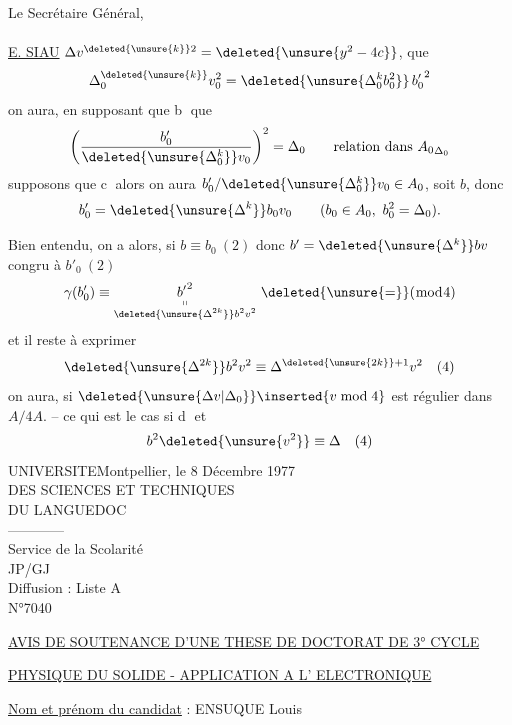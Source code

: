Le Secrétaire Général,\\
\\
\uline{E. SIAU}
  $\Delta v^{\deleted{\unsure{k}}2}=\deleted{\unsure{y^2-4c}}$,    que
\[
\Delta_0^{\deleted{\unsure{k}}}v_0^2=\deleted{\unsure{\Delta_0^k b_0^2}}\,{b'_0}^{2}
\]
on aura, en supposant que \textcircled{\scriptsize b}  que
\[
\left(\frac{b'_0}{\deleted{\unsure{\Delta_0^k}}v_0}\right)^2=\Delta_0\qquad
\text{relation dans }{A_0}_{\Delta_0}
\]
supposons que \textcircled{\scriptsize c} alors on aura $b'_0/\deleted{\unsure{\Delta_0^k}}v_0\in A_0$, soit $b$, donc
\[
b'_0=\deleted{\unsure{\Delta^k}}b_0v_0\qquad(b_0\in A_0,\ b_0^2=\Delta_0).
\]

Bien entendu, on a alors, si $b\equiv b_0\ (2)$ donc $b'=\deleted{\unsure{\Delta^k}}bv$ congru à $b'_0\ (2)$
\[
\gamma(b'_0)\equiv\underset{\substack{\shortparallel\\\deleted{\unsure{\Delta^{2k}}} b^2v^2}}{ {b'}^2}\ \deleted{\unsure{=}}(\bmod 4)
\]
et il reste à exprimer
\[
\deleted{\unsure{\Delta^{2k}}}b^2v^2\equiv\Delta^{\deleted{\unsure{2k}}+1}v^2\quad(4)
\]
on aura, si $\deleted{\unsure{\Delta v|\Delta_0}}\inserted{v\bmod4}$ est régulier dans $A/4A$. -- ce qui est le cas si \textcircled{\scriptsize d} et  
\[
b^2\deleted{\unsure{v^2}}\equiv\Delta\quad(4)
\]
UNIVERSITE\hfill Montpellier, le 8 Décembre 1977\\
DES SCIENCES ET TECHNIQUES\\
DU LANGUEDOC\\
------------\\
Service de la Scolarité\\
JP/GJ\\
Diffusion : Liste A\\
N°7040

\uline{AVIS DE SOUTENANCE D'UNE THESE DE DOCTORAT DE 3° CYCLE}

\uline{PHYSIQUE DU SOLIDE - APPLICATION A L' ELECTRONIQUE}

\uline{Nom et prénom du candidat} : ENSUQUE Louis

